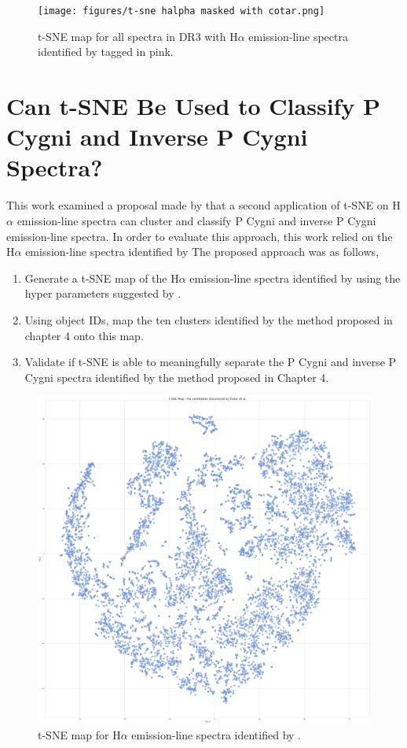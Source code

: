 \begin{figure}[!htb]
\centering
\texttt{[image: figures/t-sne halpha masked with cotar.png]}
\caption{t-SNE map for all spectra in DR3 with H$\alpha$ emission-line spectra identified by \citet{vcotar2021galah} tagged in pink.}
\label{fig5.3}
\end{figure}

\section{Can t-SNE Be Used to Classify P Cygni and Inverse P Cygni Spectra?}

This work examined a proposal made by \citet{traven2017galah} that a second application of t-SNE on H$\alpha$ emission-line spectra can cluster and classify P Cygni and inverse P Cygni emission-line spectra. In order to evaluate this approach, this work relied on the H$\alpha$ emission-line spectra identified by \citet{vcotar2021galah} The proposed approach was as follows,

\begin{enumerate}
    \item Generate a t-SNE map of the H$\alpha$ emission-line spectra identified by \citet{vcotar2021galah} using the hyper parameters suggested by \citet{traven2017galah}.
    \item Using object IDs, map the ten clusters identified by the method proposed in chapter 4 onto this map.
    \item Validate if t-SNE is able to meaningfully separate the P Cygni and inverse P Cygni spectra identified by the method proposed in Chapter 4.
\end{enumerate}

\begin{figure}[!htb]
\centering
\includegraphics[scale=0.12]{figures/t-sne cotar et al.png}
\caption{t-SNE map for H$\alpha$ emission-line spectra identified by \citet{vcotar2021galah}.}
\label{fig5.4}
\end{figure}


